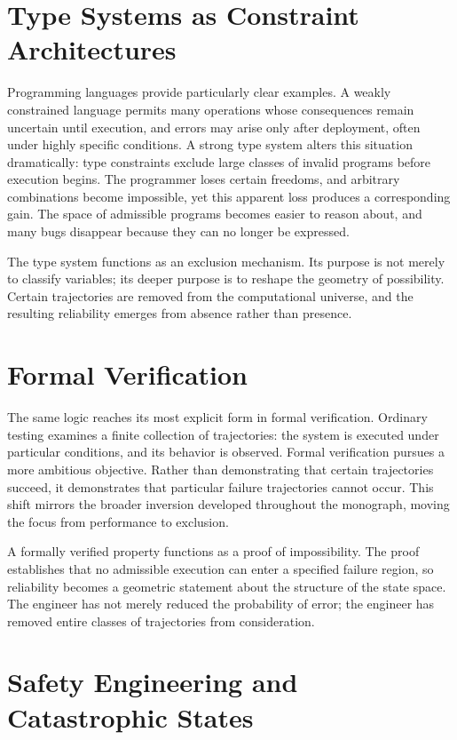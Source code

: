 \documentclass[11pt,oneside]{book}
\theoremstyle{plain}
\theoremstyle{definition}
\theoremstyle{remark}
\begin{document}
\section{Type Systems as Constraint Architectures}

Programming languages provide particularly clear examples. A weakly constrained language permits many operations whose consequences remain uncertain until execution, and errors may arise only after deployment, often under highly specific conditions. A strong type system alters this situation dramatically: type constraints exclude large classes of invalid programs before execution begins. The programmer loses certain freedoms, and arbitrary combinations become impossible, yet this apparent loss produces a corresponding gain. The space of admissible programs becomes easier to reason about, and many bugs disappear because they can no longer be expressed.

The type system functions as an exclusion mechanism. Its purpose is not merely to classify variables; its deeper purpose is to reshape the geometry of possibility. Certain trajectories are removed from the computational universe, and the resulting reliability emerges from absence rather than presence.

\section{Formal Verification}

The same logic reaches its most explicit form in formal verification. Ordinary testing examines a finite collection of trajectories: the system is executed under particular conditions, and its behavior is observed. Formal verification pursues a more ambitious objective. Rather than demonstrating that certain trajectories succeed, it demonstrates that particular failure trajectories cannot occur. This shift mirrors the broader inversion developed throughout the monograph, moving the focus from performance to exclusion.

A formally verified property functions as a proof of impossibility. The proof establishes that no admissible execution can enter a specified failure region, so reliability becomes a geometric statement about the structure of the state space. The engineer has not merely reduced the probability of error; the engineer has removed entire classes of trajectories from consideration.

\section{Safety Engineering and Catastrophic States}
\end{document}
